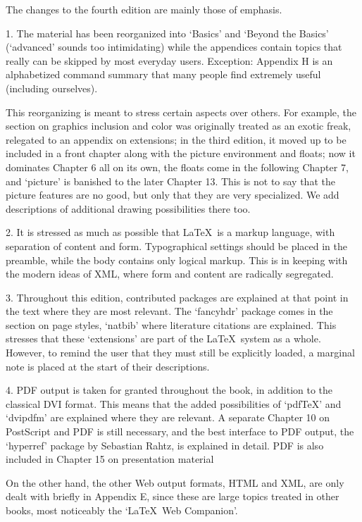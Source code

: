 \documentclass{article}
\begin{document}
The changes to the fourth edition are mainly those of emphasis.

1. The material has been reorganized into `Basics' and `Beyond the Basics'
  (`advanced' sounds too intimidating) while the appendices contain
  topics that really can be skipped by most everyday users. Exception:
  Appendix H is an alphabetized command summary that many
  people find extremely useful (including ourselves).

  This reorganizing is meant to stress certain aspects over others. For
  example, the section on graphics inclusion and color was originally
  treated as an exotic freak, relegated to an appendix on extensions; in the
  third edition, it moved up to be included in a front chapter along with the
  picture environment and floats; now it dominates
  Chapter 6 all on its own, the floats come in the following
  Chapter 7, and `picture' is banished to the later
  Chapter 13. This is not to say that the picture features are no good,
  but only that they are very specialized. We add
  descriptions of additional drawing possibilities there too.

2. It is stressed as much as possible that \LaTeX\ is a markup language,
  with separation of content and form. Typographical settings
  should be placed in the preamble, while the body contains only logical
  markup. This is in keeping with the modern ideas of XML, where form and
  content are radically segregated.

3. Throughout this edition, contributed packages are explained at that point
  in the text where they are most relevant. The `fancyhdr' package
  comes in the section on page styles, `natbib' where literature
  citations are explained. This stresses that these `extensions' are part of
  the \LaTeX\ system as a whole. However, to remind the user that they must
  still be explicitly loaded, a marginal note is placed at the start of their
  descriptions.

4. PDF output is taken for granted throughout the book, in addition to the
  classical DVI format. This means that the added possibilities of `pdf\TeX'
  and `dvipdfm' are explained where they are relevant. A separate
  Chapter 10 on PostScript and PDF is still necessary, and the
  best interface to PDF output, the `hyperref' package by Sebastian
  Rahtz, is explained in detail. PDF is also included in
  Chapter 15 on presentation material

  On the other hand, the other Web output formats, HTML and XML, are only
  dealt with briefly in Appendix E, since these are large topics
  treated in other books, most noticeably the `\LaTeX\ Web Companion'.
\end{document}

